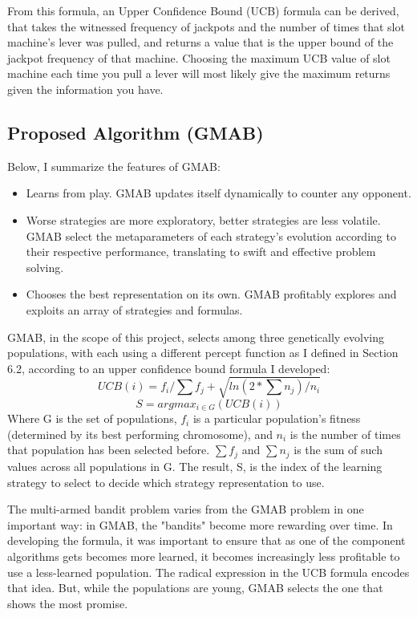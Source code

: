 \documentclass[11pt]{article}
\begin{document}
From this formula, an Upper Confidence Bound (UCB) formula can be derived, that takes the witnessed frequency of jackpots and the number of times that slot machine's lever was pulled, and returns a value that is the upper bound of the jackpot frequency of that machine. Choosing the maximum UCB value of slot machine each time you pull a lever will most likely give the maximum returns given the information you have. 

\subsection{Proposed Algorithm (GMAB)}

Below, I summarize the features of GMAB:
\begin{itemize}
    \item Learns from play. GMAB updates itself dynamically to counter any opponent.
    \item Worse strategies are more exploratory, better strategies are less volatile. GMAB select the metaparameters of each strategy's evolution according to their respective performance, translating to swift and effective problem solving.
    \item Chooses the best representation on its own. GMAB profitably explores and exploits an array of strategies and formulas.
\end{itemize}

GMAB, in the scope of this project, selects among three genetically evolving populations, with each using a different percept function as I defined in Section 6.2, according to an upper confidence bound formula I developed:
$$
UCB(i)=f_i / \sum{f_j} + \sqrt{ln(2*\sum{n_j})/n_i}
$$
$$
S = argmax_{i \in G}(UCB(i))
$$
Where G is the set of populations, $f_i$ is a particular population's fitness (determined by its best performing chromosome), and $n_i$ is the number of times that population has been selected before. $\sum{f_j}$ and $\sum{n_j}$ is the sum of such values across all populations in G. The result, S, is the index of the learning strategy to select to decide which strategy representation to use.

The multi-armed bandit problem varies from the GMAB problem in one important way: in GMAB, the "bandits" become more rewarding over time. In developing the formula, it was important to ensure that as one of the component algorithms gets becomes more learned, it becomes increasingly less profitable to use a less-learned population. The radical expression in the UCB formula encodes that idea. But, while the populations are young, GMAB selects the one that shows the most promise.
\end{document}
